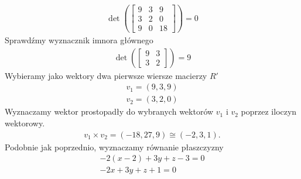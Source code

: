 \begin{gather*}
\det \left(
\begin{bmatrix}
	9 & 3 & 9  \\
	3 & 2 & 0  \\
	9 & 0 & 18
\end{bmatrix}
\right)=0
\end{gather*}
Sprawdźmy wyznacznik imnora głównego
\begin{gather*}
\det \left(
\begin{bmatrix}
	9 & 3 \\
	3 & 2
\end{bmatrix}\right)=9
\end{gather*}
Wybieramy jako wektory dwa pierwsze wiersze macierzy $ R' $
\begin{gather*}
v_1=(9,3,9)\\
v_2=(3,2,0)
\end{gather*}
Wyznaczamy wektor prostopadły do wybranych wektorów $ v_1 $ i $ v_2 $ poprzez iloczyn wektorowy.
\begin{gather*}
v_1\times v_2=(-18,27,9)\cong(-2,3,1).
\end{gather*}
Podobnie jak poprzednio, wyznaczamy równanie płaszczyzny
\begin{gather*}
-2 (x-2)+3 y+z-3=0\\
-2 x+3 y+z+1=0
\end{gather*}


